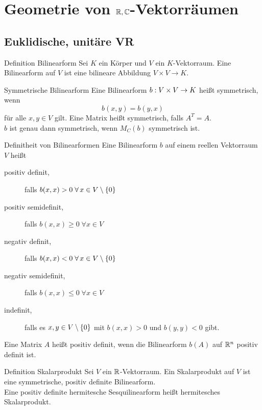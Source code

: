 \documentclass[main.tex]{subfiles}
\begin{document}
\section*{Geometrie von \(\mathbb{R}, \mathbb{C}\)-Vektorräumen}
\subsection*{Euklidische, unitäre VR}

\begin{karte}{Definition Bilinearform}
    Sei \(K\) ein Körper und \(V\) ein \(K\)-Vektorraum. 
    Eine Bilinearform auf \(V\) ist eine bilineare Abbildung 
    \(V \times V \rightarrow K\).\\
\end{karte}

\begin{karte}{Symmetrische Bilinearform}
    Eine Bilinearform \(b : V\times V \rightarrow K\) heißt symmetrisch,
    wenn
    \[ b(x,y) = b(y,x) \]
    für alle \(x, y \in V \) gilt. Eine Matrix heißt symmetrisch, 
    falls \(A^T = A\).\\
    \( b \) ist genau dann symmetrisch, wenn \( M_C(b) \) 
    symmetrisch ist.
\end{karte}

\begin{karte}{Definitheit von Bilinearformen}
    Eine Bilinearform \(b\) auf einem reellen Vektorraum \(V\) heißt
    \begin{description}
        \item[positiv definit,] falls \(b(x,x) > 0 \; \forall x \in V \setminus \set{0}\)
        \item[positiv semidefinit,] falls \(b(x,x) \geq 0 \; \forall x \in V\)
        \item[negativ definit,] falls \(b(x,x) < 0 \; \forall x \in V \setminus \set{0}\)
        \item[negativ semidefinit,] falls \(b(x,x) \leq 0 \; \forall x \in V\)
        \item[indefinit,] falls es \(x, y \in V \setminus \{0\}\) mit
        \(b(x,x) > 0\) und \(b(y,y) < 0\) gibt.  
    \end{description}
    Eine Matrix \(A\) heißt positiv definit, wenn
    die Bilinearform \( b(A) \) auf \(\mathbb{R}^n\) 
    positiv definit ist.
\end{karte}

\begin{karte}{Definition Skalarprodukt}
    Sei \(V\) ein \(\mathbb{R}\)-Vektorraum. Ein Skalarprodukt auf \(V\) ist eine
    symmetrische, positiv definite Bilinearform.\\
    Eine positiv definite hermitesche Sesquilinearform heißt hermitesches Skalarprodukt.
\end{karte}
\end{document}

